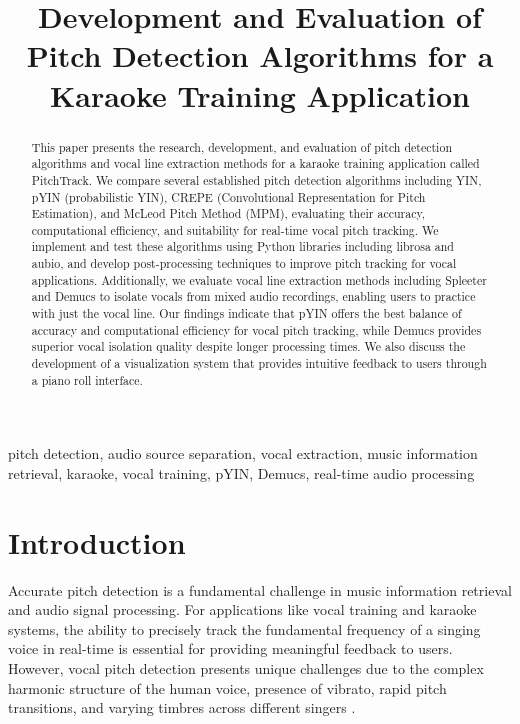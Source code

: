 \documentclass[conference]{IEEEtran}
\begin{document}
\title{Development and Evaluation of Pitch Detection Algorithms for a Karaoke Training Application\\
}

\author{
\and
{}
}

\maketitle

\begin{abstract}
This paper presents the research, development, and evaluation of pitch detection algorithms and vocal line extraction methods for a karaoke training application called PitchTrack. We compare several established pitch detection algorithms including YIN, pYIN (probabilistic YIN), CREPE (Convolutional Representation for Pitch Estimation), and McLeod Pitch Method (MPM), evaluating their accuracy, computational efficiency, and suitability for real-time vocal pitch tracking. We implement and test these algorithms using Python libraries including librosa and aubio, and develop post-processing techniques to improve pitch tracking for vocal applications. Additionally, we evaluate vocal line extraction methods including Spleeter and Demucs to isolate vocals from mixed audio recordings, enabling users to practice with just the vocal line. Our findings indicate that pYIN offers the best balance of accuracy and computational efficiency for vocal pitch tracking, while Demucs provides superior vocal isolation quality despite longer processing times. We also discuss the development of a visualization system that provides intuitive feedback to users through a piano roll interface.
\end{abstract}

\begin{IEEEkeywords}
pitch detection, audio source separation, vocal extraction, music information retrieval, karaoke, vocal training, pYIN, Demucs, real-time audio processing
\end{IEEEkeywords}

\section{Introduction}
Accurate pitch detection is a fundamental challenge in music information retrieval and audio signal processing. For applications like vocal training and karaoke systems, the ability to precisely track the fundamental frequency of a singing voice in real-time is essential for providing meaningful feedback to users. However, vocal pitch detection presents unique challenges due to the complex harmonic structure of the human voice, presence of vibrato, rapid pitch transitions, and varying timbres across different singers \cite{mauch2014pyin}.
\end{document}
